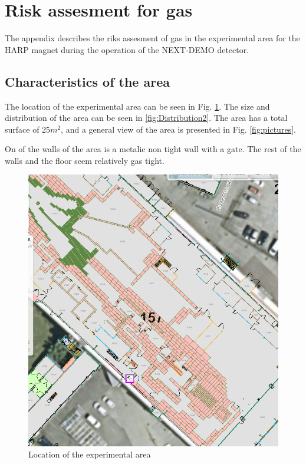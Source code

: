 \section{Risk assesment for gas}

The appendix describes the riks assesment of gas in the experimental area for the HARP magnet during the operation of the NEXT-DEMO detector.

\subsection{Characteristics of the area}

The location of the experimental area can be seen in Fig. \ref{fig:location}. The size and distribution of the area can be seen in \ref{fig:Distribution2}. The area has a total surface of 25$m^2$, and a general view of the area is presented in Fig. \ref{fig:pictures}.

On of the walls of the area is a metalic non tight wall with a gate. The rest of the walls and the floor seem relatively gas tight.

\begin{figure}
\centering
\includegraphics[angle=0,width=\textwidth]{img/generalmap.png}
\caption{Location of the experimental area} \label{fig:location}
\end{figure}


